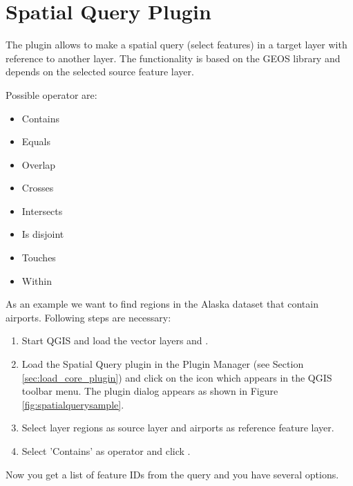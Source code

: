 
\section{Spatial Query Plugin}\label{sec:spatial_query}


The  plugin allows to make a spatial 
query (select features) in a target layer with reference to another layer. The 
functionality is based on the GEOS library and depends on the selected source 
feature layer. 

Possible operator are:

\begin{itemize}[label=--]
\item Contains
\item Equals
\item Overlap
\item Crosses
\item Intersects
\item Is disjoint
\item Touches
\item Within
\end{itemize}


As an example we want to find regions in the Alaska dataset that contain 
airports. Following steps are necessary:

\begin{enumerate}
  \item Start QGIS and load the vector layers  and . 
  \item Load the Spatial Query plugin in the Plugin Manager (see Section 
  \ref{sec:load_core_plugin}) and click on the     
  icon which appears in the QGIS toolbar menu. The plugin dialog appears as shown 
  in Figure \ref{fig:spatialquerysample}.
  \item Select layer regions as source layer and airports as reference feature layer.
  \item Select 'Contains' as operator and click .
\end{enumerate}

Now you get a list of feature IDs from the query and you have several options.

